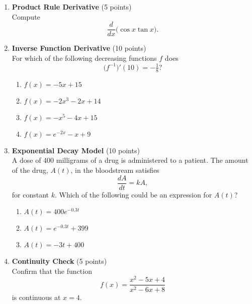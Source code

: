 \begin{enumerate}
  \item \textbf{Product Rule Derivative} (5 points)\\
  Compute
  \[
    \frac{d}{dx}\bigl(\cos x \tan x\bigr).
  \]
  \begin{subanswer}
  \end{subanswer}

  \item \textbf{Inverse Function Derivative} (10 points)\\
  For which of the following decreasing functions $f$ does
  \[
    \bigl(f^{-1}\bigr)'(10) = -\tfrac{1}{8}?
  \]
  \begin{enumerate}[label=(\Alph*)]
    \item $f(x) = -5x + 15$
    \item $f(x) = -2x^3 - 2x + 14$
    \item $f(x) = -x^5 - 4x + 15$
    \item $f(x) = e^{-2x} - x + 9$
  \end{enumerate}
  \begin{subanswer}
  \end{subanswer}

  \item \textbf{Exponential Decay Model} (10 points)\\
  A dose of 400 milligrams of a drug is administered to a patient. The amount of the drug, $A(t)$, in the bloodstream satisfies
  \[
    \frac{dA}{dt} = k A,
  \]
  for constant $k$. Which of the following could be an expression for $A(t)$?\\
  \begin{enumerate}[label=(\Alph*)]
    \item $A(t) = 400 e^{-0.3t}$
    \item $A(t) = e^{-0.3t} + 399$
    \item $A(t) = -3t + 400$
  \end{enumerate}
  \begin{subanswer}
  \end{subanswer}

  \item \textbf{Continuity Check} (5 points)\\
  Confirm that the function
  \[
    f(x) = \frac{x^2 - 5x + 4}{x^2 - 6x + 8}
  \]
  is continuous at $x = 4$.  
  \begin{subanswer}
  \end{subanswer}


\end{enumerate}
